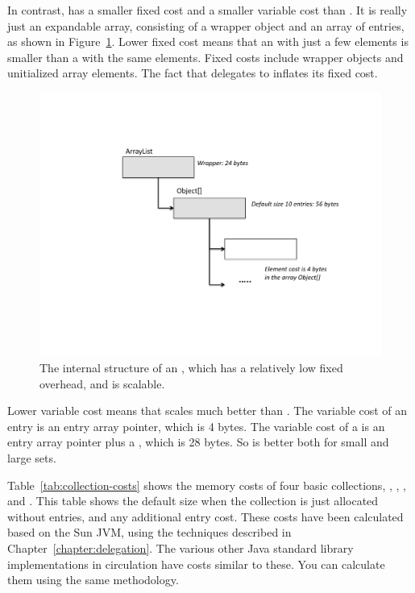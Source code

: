 In contrast,  has a smaller fixed cost and a smaller
variable cost than . It is really just an expandable array,
consisting of a wrapper object and an array of entries, as shown in Figure~\ref{fig:arraylist}. 
Lower fixed cost means that an  with just a few
 elements is smaller than a  with the same elements. Fixed costs
 include wrapper objects and unitialized array elements. The fact that 
 delegates to  inflates its fixed cost. 
 \begin{figure}
  \centering
 \includegraphics[width=.80\textwidth]{part1/Figures/collections/arraylist.pdf}
  \caption{The internal structure of an , which has a
  relatively low fixed overhead, and is scalable.}
  \label{fig:arraylist}
\end{figure}
 Lower variable cost means that
  scales much better than . The variable cost
 of an  entry is an entry array pointer, which is 4 bytes.
 The variable cost of a  is an entry array pointer plus a
 , which is 28 bytes. So   is better
 both for small and large sets.

Table~\ref{tab:collection-costs} shows the memory costs of four basic
collections, , , , and .
This table shows the default size when the collection is just allocated without
entries, and any additional entry cost. These costs have
been calculated based on the Sun JVM, using the techniques described in Chapter~\ref{chapter:delegation}. 
The various other Java standard
library implementations in circulation have costs
similar to these. You can calculate them using the same methodology.


